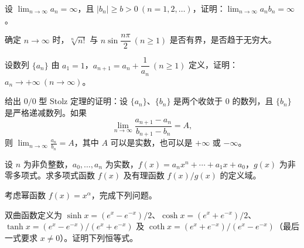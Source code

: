 \noindent\begin{minipage}{\textwidth}
设 $\displaystyle\lim_{n\to\infty}a_n=\infty$，且 $|b_n|\ge b>0\ (n=1,2,\ldots)$，证明：$\displaystyle\lim_{n\to\infty}a_nb_n=\infty$。
\end{minipage}\par\vfill
\noindent\begin{minipage}{\textwidth}
确定 $n\to\infty$ 时，$\sqrt[n]{n!}$ 与 $n\sin\dfrac{n\pi}{2}\ (n\ge1)$ 是否有界，是否趋于无穷大。
\end{minipage}\par\vfill
\newpage
\noindent\begin{minipage}{\textwidth}
设数列 $\{a_n\}$ 由 $a_1=1$，$a_{n+1}=a_n+\dfrac1{a_n}\ (n\ge1)$ 定义，证明：$a_n\to+\infty\ (n\to\infty)$。
\end{minipage}\par\vfill
\noindent\begin{minipage}{\textwidth}
给出 $0/0$ 型 Stolz 定理的证明：设 $\{a_n\}$、$\{b_n\}$ 是两个收敛于 $0$ 的数列，且 $\{b_n\}$ 是严格递减数列。如果\[\lim_{n\to\infty}\frac{a_{n+1}-a_n}{b_{n+1}-b_n}=A,\]则 $\displaystyle\lim_{n\to\infty}\frac{a_n}{b_n}=A$，其中 $A$ 可以是实数，也可以是 $+\infty$ 或 $-\infty$。
\end{minipage}\par\vfill
\noindent\begin{minipage}{\textwidth}
设 $n$ 为非负整数，$a_0,\ldots,a_n$ 为实数，$f(x)=a_nx^n+\cdots+a_1x+a_0$，$g(x)$ 为非零多项式。求多项式函数 $f(x)$ 及有理函数 $f(x)/g(x)$ 的定义域。
\end{minipage}\par\vfill
\noindent\begin{minipage}{\textwidth}
考虑幂函数 $f(x)=x^\alpha$，完成下列问题。
\end{minipage}\par\vfill
\newpage
\noindent\begin{minipage}{\textwidth}
双曲函数定义为 $\sinh x=(e^x-e^{-x})/2$、$\cosh x=(e^x+e^{-x})/2$、$\tanh x=(e^x-e^{-x})/(e^x+e^{-x})$ 及 $\coth x=(e^x+e^{-x})/(e^x-e^{-x})$（最后一式要求 $x\ne0$）。证明下列恒等式。
\end{minipage}\par\vfill
